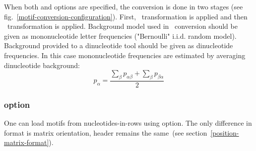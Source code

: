 


When both  and  options are specified, the conversion is done in two stages (see fig.~\ref{motif-conversion-configuration}). First, \PcmToPwm\ transformation is applied and then \PwmToDiPwm\ transformation is applied. 
Background model used in \PcmToPwm\ conversion should be given as mononucleotide letter frequencies ("Bernoulli" i.i.d. random model). Background provided to a dinucleotide tool should be given as dinucleotide frequencies. In this case mononucleotide frequencies are estimated by averaging dinucleotide background:
\begin{equation}p_{\alpha} = \frac{\sum_{\beta}p_{\alpha\beta} + \sum_{\beta}p_{\beta\alpha}}{2}\end{equation}


\subsubsection{ option}\label{TransposeOption}
One can load motifs from nucleotides-in-rows using  option. The only difference in format is matrix orientation, header remains the same~(see section~\ref{position-matrix-format}).
